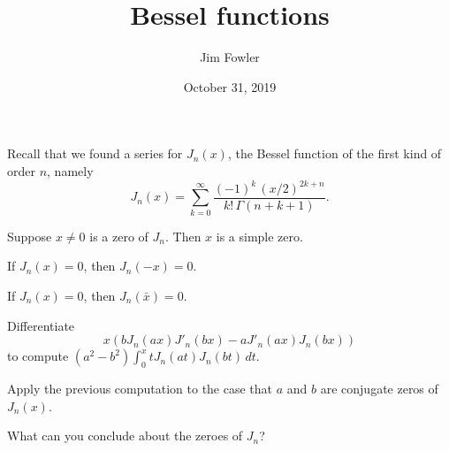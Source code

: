 \documentclass{homework}
\author{Jim Fowler}
\title{Bessel functions}
\date{October 31, 2019}
\begin{document}
\maketitle

\begin{problem}
Recall that we found a series for $J_n(x)$, the Bessel function of the first kind of order $n$, namely
\[
  J_n(x) = \sum_{k=0}^\infty \frac{(-1)^k \, (x/2)^{2k + n}}{k! \, \Gamma(n + k + 1)}.
\]
\end{problem}

\begin{problem}
  Suppose $x \neq 0$ is a zero of $J_n$.  Then $x$ is a simple zero.
\end{problem}

\begin{problem}
  If $J_n(x) = 0$, then $J_n(-x) = 0$.
\end{problem}

\begin{problem}
  If $J_n(x) = 0$, then $J_n(\bar{x}) = 0$.
\end{problem}

\begin{problem}
  Differentiate
  \[
    x \left( b J_n(ax) J'_n(bx) - a J'_n(ax) J_n(bx) \right)
  \]
  to compute
   $(a^2-b^2) \int_0^x t J_n(at) J_n(bt) \, dt$.
\end{problem}

\vfill

\begin{problem}
  Apply the previous computation to the case that  $a$ and $b$ are conjugate zeros of $J_n(x)$.
\end{problem}

\vfill

\begin{problem}
  What can you conclude about the zeroes of $J_n$?
\end{problem}

\vfill
\end{document}
